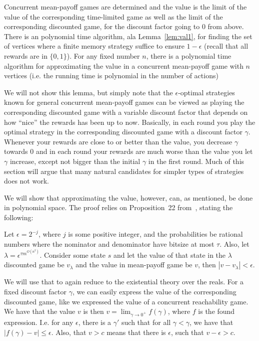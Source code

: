 \begin{lemma}\label{lemm:class_meanpayoff}
Concurrent mean-payoff games are determined and the value is the limit of the value of the corresponding time-limited game as well as the limit of the corresponding discounted game, for the discount factor going to 0 from above.
There is an polynomial time algorithm, ala Lemma~\ref{lem:val1}, for finding the set of vertices where a finite memory strategy suffice to ensure $1-\epsilon$ (recall that all rewards are in $\{0,1\}$).
For any fixed number $n$, there is a polynomial time algorithm for approximating the value in a concurrent mean-payoff game with $n$ vertices (i.e. the running time is polynomial in the number of actions)
\end{lemma}
We will not show this lemma, but simply note that the $\epsilon$-optimal strategies known for general concurrent mean-payoff games  can be viewed as playing the corresponding discounted game with a variable discount factor that depends on how ``nice'' the rewards has been up to now. Basically, in each round you play the optimal strategy in the corresponding discounted game with a discount factor $\gamma$. Whenever 
 your rewards are close to or better than the value, you decrease $\gamma$ towards 0 and in each round your rewards are much worse than the value you let $\gamma$ increase, except not bigger than the initial $\gamma$ in the first round. Much of this section will argue that many natural candidates for simpler types of strategies does not work.


We will show that approximating the value, however, can, as mentioned, be done in polynomial space. The proof relies on Proposition~22 from~\cite{HKLMT:2011}, stating the following:
\begin{proposition}
Let $\epsilon=2^{-j}$, where $j$ is some positive integer, and the probabilities be rational numbers where the nominator and denominator have bitsize at most $\tau$. Also, let $\lambda=\epsilon^{\tau m^{O(n^2)}}$. Consider some state $s$ and let the value of that state in the $\lambda$ discounted game be $v_{\lambda}$ and the value in mean-payoff game be $v$, then $|v-v_{\lambda}|<\epsilon$.
\end{proposition}

We will use that to again reduce to the existential theory over the reals. 
For a fixed discount factor $\gamma$, we can easily express the value of the corresponding discounted game, like we expressed the value of a concurrent reachability game.
We have that the value $v$ is then $v=\lim_{\gamma\rightarrow 0^+} f(\gamma)$, where $f$ is the found expression.
I.e. for any $\epsilon$, there is a $\gamma'$ such that for all $\gamma<\gamma$, we have that $|f(\gamma)-v|\leq \epsilon$.
Also, that $v>c$ means that there is $\epsilon$, such that $v-\epsilon>c$.

